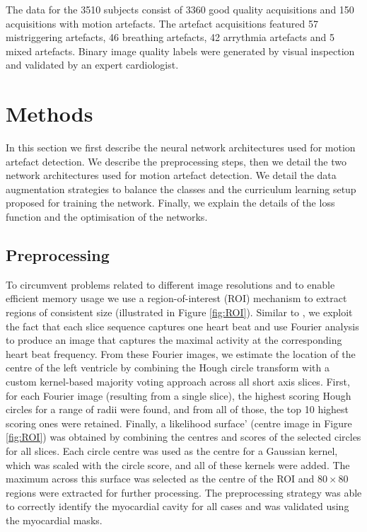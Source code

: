 \documentclass[preprint,12pt,authoryear]{elsarticle}
\begin{document}
The data for the 3510 subjects consist of 3360 good quality acquisitions and 150 acquisitions with motion artefacts.
The artefact acquisitions featured 57 mistriggering artefacts, 46 breathing artefacts, 42 arrythmia artefacts and 5 mixed artefacts. Binary image quality labels were generated by visual inspection and validated by an expert cardiologist.\\




\section{Methods}
\label{sec:methods}

In this section we first describe the neural network architectures used for motion artefact detection. We describe the preprocessing steps, then we detail the two network architectures used for motion artefact detection. We detail the data augmentation strategies to balance the classes and the curriculum learning setup proposed for training the network. Finally, we explain the details of the loss function and the optimisation of the networks.


\subsection{Preprocessing}
\label{sec:pre}

To circumvent problems related to different image resolutions and to enable efficient memory usage we use a region-of-interest (ROI) mechanism to extract regions of consistent size (illustrated in Figure \ref{fig:ROI}). Similar to \cite{Korshunova2016}, we exploit the fact that each slice sequence captures one heart beat and use Fourier analysis to produce an image that captures the maximal activity at the corresponding heart beat frequency.  From these Fourier images, we estimate the location of the centre of the left ventricle by combining the Hough circle transform with a custom kernel-based majority voting approach across all short axis slices. First, for each Fourier image (resulting from a single slice), the  highest scoring Hough circles for a range of radii were found, and from all of those, the  top 10 highest scoring ones were retained. Finally, a likelihood surface’ (centre image in Figure \ref{fig:ROI}) was obtained by combining the centres and scores of the selected circles for all slices. Each circle centre was used as the centre for a Gaussian kernel, which was scaled with the circle score, and all of these kernels were added. The maximum across this surface was selected as the centre of the ROI and $80 \times 80$ regions were extracted for further processing.  The preprocessing strategy was able to correctly identify the myocardial cavity for all cases and  was validated using the myocardial masks.\\
\end{document}
